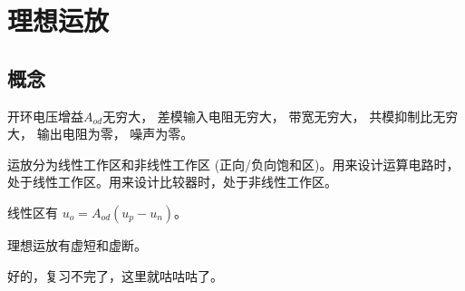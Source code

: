 \documentclass[cn,11pt,chinese,black,simple]{../elegantbook}
\begin{document}
\fi 


\chapter{理想运放}

\section{概念}

开环电压增益\(A_{od}\)无穷大，
差模输入电阻无穷大，
带宽无穷大，
共模抑制比无穷大，
输出电阻为零，
噪声为零。

运放分为线性工作区和非线性工作区 (正向/负向饱和区)。用来设计运算电路时，处于线性工作区。用来设计比较器时，处于非线性工作区。

线性区有 \(u_o = A_{od} (u_p - u_n)\)。

理想运放有虚短和虚断。


好的，复习不完了，这里就咕咕咕了。


\ifx\mainclass\undefined
\end{document}

